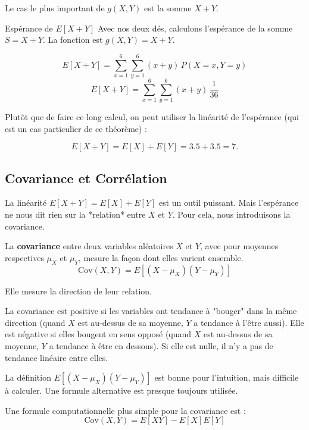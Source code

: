 Le cas le plus important de $g(X,Y)$ est la somme $X+Y$.

\begin{examplebox}{Espérance de $E[X+Y]$}
Avec nos deux dés, calculons l'espérance de la somme $S = X + Y$.  
La fonction est $g(X,Y) = X + Y$.

\[
E[X+Y] = \sum_{x=1}^6 \sum_{y=1}^6 (x+y)\, P(X=x, Y=y)
\]
\[
E[X+Y] = \sum_{x=1}^6 \sum_{y=1}^6 (x+y)\, \frac{1}{36}
\]

Plutôt que de faire ce long calcul, on peut utiliser la linéarité de l'espérance (qui est un cas particulier de ce théorème) :

\[
E[X+Y] = E[X] + E[Y] = 3.5 + 3.5 = 7.
\]
\end{examplebox}

\subsection{Covariance et Corrélation}

La linéarité $E[X+Y] = E[X] + E[Y]$ est un outil puissant. Mais l'espérance ne nous dit rien sur la *relation* entre $X$ et $Y$. Pour cela, nous introduisons la covariance.

\begin{definitionbox}[Covariance]
La \textbf{covariance} entre deux variables aléatoires $X$ et $Y$, avec pour moyennes respectives $\mu_X$ et $\mu_Y$, mesure la façon dont elles varient ensemble.
$$\text{Cov}(X,Y) = E[(X - \mu_X)(Y - \mu_Y)]$$
\end{definitionbox}

Elle mesure la direction de leur relation.

\begin{intuitionbox}
La covariance est positive si les variables ont tendance à "bouger" dans la même direction (quand $X$ est au-dessus de sa moyenne, $Y$ a tendance à l'être aussi). Elle est négative si elles bougent en sens opposé (quand $X$ est au-dessus de sa moyenne, $Y$ a tendance à être en dessous). Si elle est nulle, il n'y a pas de tendance linéaire entre elles.
\end{intuitionbox}

La définition $E[(X - \mu_X)(Y - \mu_Y)]$ est bonne pour l'intuition, mais difficile à calculer. Une formule alternative est presque toujours utilisée.

\begin{theorembox}
Une formule computationnelle plus simple pour la covariance est :
$$\text{Cov}(X,Y) = E[XY] - E[X]E[Y]$$
\end{theorembox}

